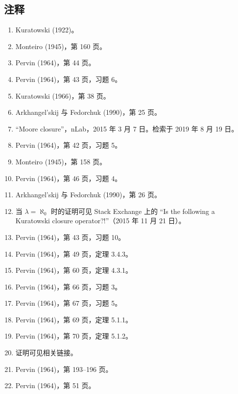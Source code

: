 \subsection{注释}
\begin{enumerate}
  \item Kuratowski (1922)。
  \item Monteiro (1945)，第 160 页。
  \item Pervin (1964)，第 44 页。
  \item Pervin (1964)，第 43 页，习题 6。
  \item Kuratowski (1966)，第 38 页。
  \item Arkhangel'skij 与 Fedorchuk (1990)，第 25 页。
  \item “Moore closure”，nLab，2015 年 3 月 7 日。检索于 2019 年 8 月 19 日。
  \item Pervin (1964)，第 42 页，习题 5。
  \item Monteiro (1945)，第 158 页。
  \item Pervin (1964)，第 46 页，习题 4。
  \item Arkhangel'skij 与 Fedorchuk (1990)，第 26 页。
  \item 当 $\lambda = \aleph_{0}$ 时的证明可见 Stack Exchange 上的 “Is the following a Kuratowski closure operator?!”（2015 年 11 月 21 日）。
  \item Pervin (1964)，第 43 页，习题 10。
  \item Pervin (1964)，第 49 页，定理 3.4.3。
  \item Pervin (1964)，第 60 页，定理 4.3.1。
  \item Pervin (1964)，第 66 页，习题 3。
  \item Pervin (1964)，第 67 页，习题 5。
  \item Pervin (1964)，第 69 页，定理 5.1.1。
  \item Pervin (1964)，第 70 页，定理 5.1.2。
  \item 证明可见相关链接。
  \item Pervin (1964)，第 193–196 页。
  \item Pervin (1964)，第 51 页。
\end{enumerate}
